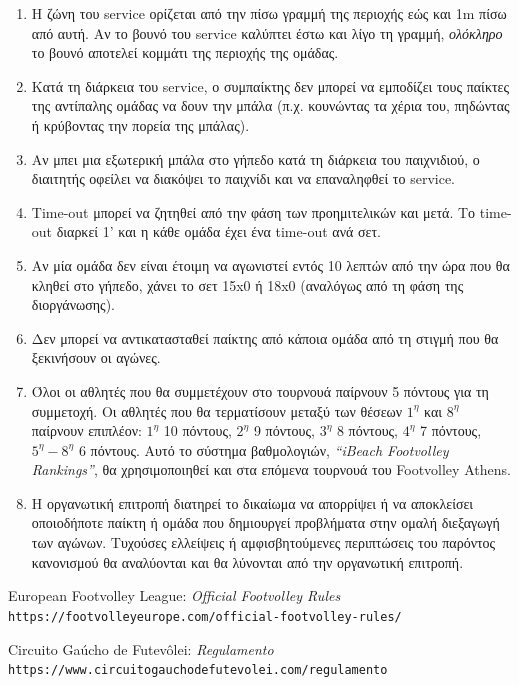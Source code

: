 \documentclass[a4paper,11pt]{article}
\begin{document}
\begin{enumerate}
\item Η ζώνη του service ορίζεται από την πίσω γραμμή της περιοχής εώς και 1m
  πίσω από αυτή. Αν το βουνό του service καλύπτει έστω και λίγο τη γραμμή,
  \textit{ολόκληρο} το βουνό αποτελεί κομμάτι της περιοχής της ομάδας.

\item Κατά τη διάρκεια του service, ο συμπαίκτης δεν μπορεί να εμποδίζει τους
  παίκτες της αντίπαλης ομάδας να δουν την μπάλα (π.χ. κουνώντας τα χέρια του,
  πηδώντας ή κρύβοντας την πορεία της μπάλας).

\item Αν μπει μια εξωτερική μπάλα στο γήπεδο κατά τη διάρκεια του παιχνιδιού, ο
  διαιτητής οφείλει να διακόψει το παιχνίδι και να επαναληφθεί το service.

\item Time-out μπορεί να ζητηθεί από την φάση των προημιτελικών και μετά. Το
  time-out διαρκεί 1' και η κάθε ομάδα έχει ένα time-out ανά σετ.

\item Αν μία ομάδα δεν είναι έτοιμη να αγωνιστεί εντός 10 λεπτών από την ώρα που
  θα κληθεί στο γήπεδο, χάνει το σετ 15x0 ή 18x0 (αναλόγως από τη φάση της
  διοργάνωσης).

\item Δεν μπορεί να αντικατασταθεί παίκτης από κάποια ομάδα από τη στιγμή που θα
  ξεκινήσουν οι αγώνες.

\item Όλοι οι αθλητές που θα συμμετέχουν στο τουρνουά παίρνουν 5 πόντους για τη
  συμμετοχή. Οι αθλητές που θα τερματίσουν μεταξύ των θέσεων $1^{\eta}$ και
  $8^{\eta}$ παίρνουν επιπλέον: $1^{\eta}$ 10 πόντους, $2^{\eta}$ 9 πόντους,
  $3^{\eta}$ 8 πόντους, $4^{\eta}$ 7 πόντους, $5^{\eta}-8^{\eta}$ 6 πόντους.
  Αυτό το σύστημα βαθμολογιών, \textit{``iBeach Footvolley Rankings''}, θα
  χρησιμοποιηθεί και στα επόμενα τουρνουά του Footvolley Athens.

\item Η οργανωτική επιτροπή διατηρεί το δικαίωμα να απορρίψει ή να αποκλείσει
  οποιοδήποτε παίκτη ή ομάδα που δημιουργεί προβλήματα στην ομαλή διεξαγωγή των
  αγώνων. Τυχούσες ελλείψεις ή αμφισβητούμενες περιπτώσεις του παρόντος
  κανονισμού θα αναλύονται και θα λύνονται από την οργανωτική επιτροπή.

\end{enumerate}

\renewcommand{\refname}{}

\begin{thebibliography}{1}

  European Footvolley League:
  \textit{Official Footvolley Rules}
  \\\texttt{https://footvolleyeurope.com/official-footvolley-rules/}

  Circuito Gaúcho de Futevôlei:
  \textit{Regulamento}
  \\\texttt{https://www.circuitogauchodefutevolei.com/regulamento}
\end{thebibliography}
\end{document}
